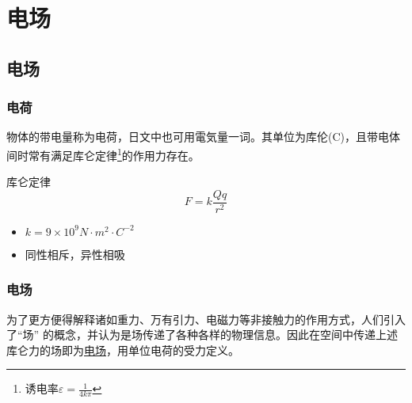 
\section{电场}

\subsection{电场}

\subsubsection{电荷}

物体的带电量称为电荷，日文中也可用電気量一词。其单位为库伦(C)，且带电体间时常有满足库仑定律\footnote{诱电率$\varepsilon=\frac{1}{4k\pi}$}的作用力存在。
\begin{itembox}[l]{库仑定律}
    \begin{equation*}
        F=k\frac{Qq}{r^2}
    \end{equation*}
    \begin{itemize}
        \item $k=9\times10^9N\cdot m^2\cdot C^{-2}$
        \item 同性相斥，异性相吸
    \end{itemize}
\end{itembox}

\subsubsection{电场}

为了更方便得解释诸如重力、万有引力、电磁力等非接触力的作用方式，人们引入了“场” 的概念，并认为是场传递了各种各样的物理信息。因此在空间中传递上述库仑力的场即为\underline{电场}，用单位电荷的受力定义。

